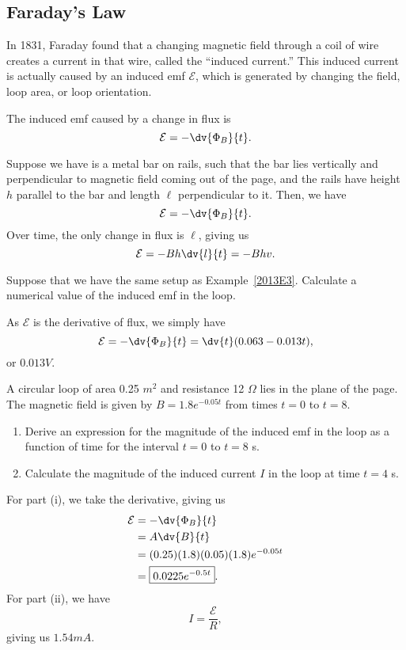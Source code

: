 \documentclass[11pt]{article}
\begin{document}
\subsection{Faraday's Law}
In 1831, Faraday found that a changing magnetic field through a coil of wire creates a current in that wire, called the ``induced current.'' This induced current is actually caused by an induced emf $\mathcal{E}$, which is generated by changing the field, loop area, or loop orientation.
\begin{thrm}
    The induced emf caused by a change in flux is
    \begin{equation}
        \mathcal{E} = - \dv{\Phi_B}{t}.
    \end{equation}
\end{thrm}
Suppose we have is a metal bar on rails, such that the bar lies vertically and perpendicular to magnetic field coming out of the page, and the rails have height $h$ parallel to the bar and length $\ell$ perpendicular to it. Then, we have
\[\mathcal{E} = -\dv{\Phi_B}{t}.\]
Over time, the only change in flux is $\ell$, giving us
\[\mathcal{E} = -Bh\dv{l}{t} = -Bhv.\]

\begin{example}[2013 E3]
    Suppose that we have the same setup as Example~\ref{2013E3}. Calculate a numerical value of the induced emf in the loop.
\end{example}
\begin{solution}
    As $\mathcal{E}$ is the derivative of flux, we simply have
    \[\mathcal{E} = -\dv{\Phi_B}{t} = \dv{t} (0.063 - 0.013t),\]
    or $\boxed{0.013 V}$.
\end{solution}
\begin{example}
    A circular loop of area 0.25 $m^2$ and resistance 12 $\Omega$ lies in the plane of the page. The magnetic field is given by $B = 1.8e^{-0.05t}$ from times $t = 0$ to $t = 8$.
    \begin{enumerate}[label=\roman*.]
        \item Derive an expression for the magnitude of the induced emf in the loop as a function of time for the interval $t = 0$ to $t = 8$ s.
        \item Calculate the magnitude of the induced current $I$ in the loop at time $t= 4$ s.
    \end{enumerate}
\end{example}
\begin{solution}
    For part (i), we take the derivative, giving us
    \begin{align*}
        \mathcal{E} &= - \dv{\Phi_B}{t} \\
        &= A\dv{B}{t} \\
        &= (0.25)(1.8)(0.05)(1.8)e^{-0.05t} \\
        &= \boxed{0.0225e^{-0.5t}}.
    \end{align*}
    For part (ii), we have
    \[I = \frac{\mathcal{E}}{R},\]
    giving us $\boxed{1.54 mA}$.
\end{solution}
\end{document}
